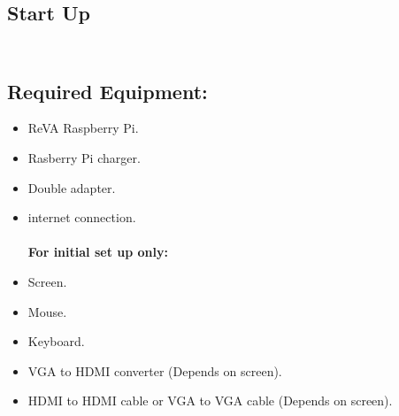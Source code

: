 \subsection{Start Up}
	\subsection*{\\Required Equipment:\\}
		\begin{itemize}
			\item ReVA Raspberry Pi.
			\item Rasberry Pi charger.
			\item Double adapter.
			\item internet connection.
			\textbf{\\\\For initial set up only: }
			\item Screen.
			\item Mouse.
			\item Keyboard.
			\item VGA to HDMI converter (Depends on screen).
			\item HDMI to HDMI cable or VGA to VGA cable (Depends on screen).
		\end{itemize}


